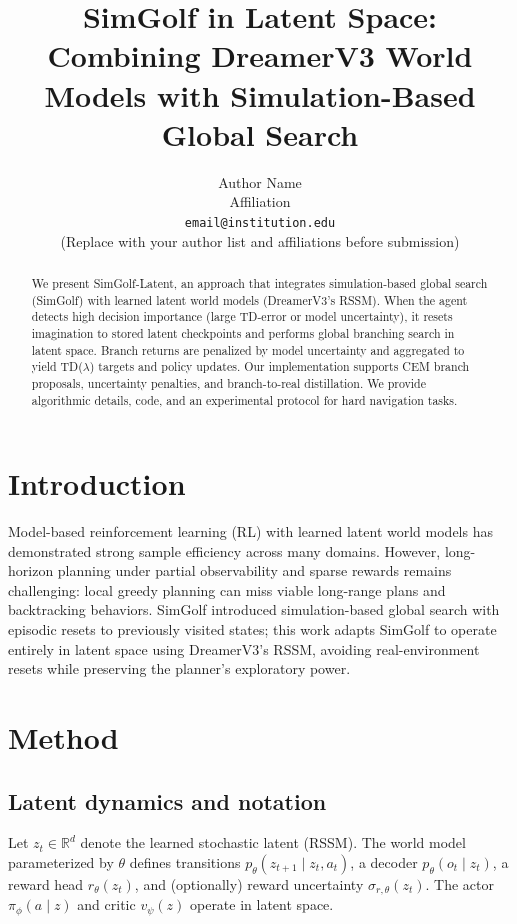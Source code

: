 \documentclass{article}
\title{SimGolf in Latent Space: Combining DreamerV3 World Models with Simulation-Based Global Search}
\author{Author Name \\
Affiliation \\
\texttt{email@institution.edu} \\
(Replace with your author list and affiliations before submission)}
\date{}
\begin{document}
\maketitle

\begin{abstract}
We present SimGolf-Latent, an approach that integrates simulation-based global
search (SimGolf) with learned latent world models (DreamerV3's RSSM). When the
agent detects high decision importance (large TD-error or model uncertainty),
it resets imagination to stored latent checkpoints and performs global branching
search in latent space. Branch returns are penalized by model uncertainty and
aggregated to yield TD(\(\lambda\)) targets and policy updates. Our
implementation supports CEM branch proposals, uncertainty penalties, and
branch-to-real distillation. We provide algorithmic details, code, and an
experimental protocol for hard navigation tasks.
\end{abstract}

\section{Introduction}
Model-based reinforcement learning (RL) with learned latent world models has
demonstrated strong sample efficiency across many domains. However, long-horizon
planning under partial observability and sparse rewards remains challenging:
local greedy planning can miss viable long-range plans and backtracking behaviors.
SimGolf \cite{sim_golf} introduced simulation-based global search with episodic
resets to previously visited states; this work adapts SimGolf to operate entirely
in latent space using DreamerV3's RSSM, avoiding real-environment resets while
preserving the planner's exploratory power.

\section{Method}
\subsection{Latent dynamics and notation}
Let \(z_t\in\mathbb{R}^d\) denote the learned stochastic latent (RSSM). The
world model parameterized by \(\theta\) defines transitions \(p_\theta(z_{t+1}\mid z_t,a_t)\),
a decoder \(p_\theta(o_t\mid z_t)\), a reward head \(r_\theta(z_t)\), and (optionally)
reward uncertainty \(\sigma_{r,\theta}(z_t)\). The actor \(\pi_\phi(a\mid z)\)
and critic \(v_\psi(z)\) operate in latent space.
\end{document}
